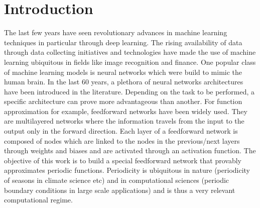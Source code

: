 \documentclass[AMS,STIX1COL]{WileyNJD-v2}
\begin{document}
\maketitle



\section{Introduction}

The last few years have seen revolutionary advances in machine learning techniques in particular through deep learning. The rising availability of data through data collecting initiatives and technologies have made the use of machine learning ubiquitous in fields like image recognition and finance. One popular class of machine learning models is neural networks which were build to mimic the human brain. In the last 60 years, a plethora of neural networks architectures have been introduced in the literature. Depending on the task to be performed, a specific architecture can prove more advantageous than another. For function approximation for example, feedforward networks have been widely used. They are multilayered networks where the information travels from the input to the output only in the forward direction. Each layer of a feedforward network is composed of nodes which are linked to the nodes in the previous/next layers through weights and biases and are activated through an activation function. The objective of this work is to build a special feedforward network that provably approximates periodic functions. Periodicity is ubiquitous in nature (periodicity of seasons in climate science etc) and in computational sciences (periodic boundary conditions in large scale applications) and is thus a very relevant computational regime.
\end{document}

